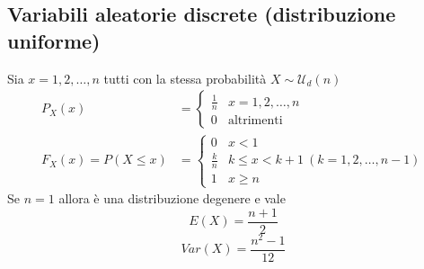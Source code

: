 \newpage
\subsection*{Variabili aleatorie discrete (distribuzione uniforme)}
Sia $x = 1,2,\dots,n$ tutti con la stessa probabilità $X \sim \mathscr{U}_d(n) $
\begin{align*}
    P_X(x) &=
    \begin{cases}
        \frac{1}{n} & x = 1,2,\dots,n\\
        0 & \text {altrimenti}
    \end{cases}
    \\
    F_X(x) = P(X \le x) &=
    \begin{cases}
        0 & x < 1\\
        \frac{k}{n} & k \le x < k + 1 \ (k = 1,2,\dots,n-1)\\
        1 & x \ge n
    \end{cases}
\end{align*}
Se $n = 1$ allora è una distribuzione degenere e vale
$$
E(X) = \frac{n+1}{2}
$$
$$
\mathit{Var}(X) = \frac{n^2-1}{12}
$$
